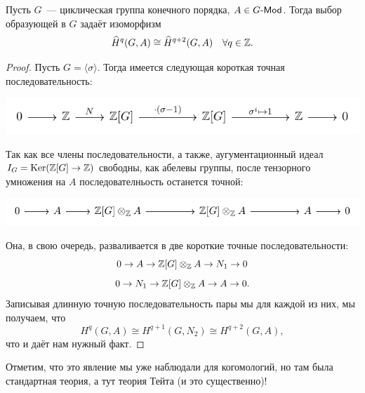  	 \begin{theorem} 
 	 	Пусть $G$~--- циклическая группа конечного порядка, $A \in G\text{-}\mathsf{Mod}$. Тогда выбор образующей в $G$ задаёт изоморфизм 
 	 	\[
 	 		\widehat{H}^{q}(G, A) \cong \widehat{H}^{q + 2}(G, A) \quad \forall q \in \mathbb{Z}.
 	 	\]
 	 \end{theorem}
 	 \begin{proof}
 	 	Пусть $G = \langle \sigma \rangle$. Тогда имеется следующая короткая точная последовательность: 

 	 	\begin{center}
 	 		\includegraphics{lectures/6/pictures/cd_49.pdf}
 	 	\end{center}

 	 	Так как все члены последовательности, а также, аугументационный идеал $I_{G} = \Ker\lr*{\Z[G] \to \Z} $ свободны, как абелевы группы,  после тензорного умножения на $A$ последователньость останется точной: 

 	 	\begin{center}
 	 		\includegraphics{lectures/6/pictures/cd_50.pdf}
 	 	\end{center}

 	 	Она, в свою очередь, разваливается в две короткие точные последовательности: 
 	 	\[
 	 		0 \to A \to \mathbb{Z}[G] \otimes_{\mathbb{Z}} A \to N_1 \to 0
 	 	\]
 	 	\[
 	 		0 \to N_1 \to \mathbb{Z}[G] \otimes_{\mathbb{Z}} A \to A \to 0.
 	 	\]
 	 	Записывая длинную точную последовательность пары мы для каждой из них, мы получаем, что 
 	 	\[
 	 		H^{q}(G, A) \cong H^{q + 1}(G, N_2) \cong H^{q + 2}(G, A),  
 	 	\]
 	 	что и даёт нам нужный факт. 
 	 \end{proof}


 	 \begin{remark}
 	 	Отметим, что это явление мы уже наблюдали для когомологий, но там была стандартная теория, а тут теория Тейта (и это существенно)!
 	 \end{remark}



   

 	 

